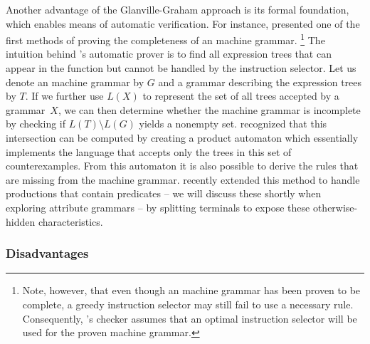 Another advantage of the \gls{Glanville-Graham approach} is its formal
foundation, which enables means of automatic verification.
%
For instance, \textcite{Emmelmann:1992:Testing} presented one of the first
methods of proving the completeness of an \gls{machine grammar}.\!%
%
\footnote{%
  Note, however, that even though an \gls{machine grammar} has been proven to be
  complete, a greedy \gls{instruction selector} may still fail to use a
  necessary \gls{rule}.
  Consequently, \citeauthor{Emmelmann:1992:Testing}'s checker assumes that an
  optimal \gls{instruction selector} will be used for the proven \gls{machine
    grammar}.%
}
%
The intuition behind \citeauthor{Emmelmann:1992:Testing}'s automatic prover is
to find all \glspl{expression tree} that can appear in the \gls{function} but
cannot be handled by the \gls{instruction selector}.
%
Let us denote an \gls{machine grammar} by $G$ and a \gls{grammar} describing the
\glspl{expression tree} by $T$\!.
%
If we further use $L(X)$ to represent the set of all \glspl{tree} accepted by a
\gls{grammar}~$X$, we can then determine whether the \gls{machine grammar} is
incomplete by checking if $L(T) \setminus L(G)$ yields a nonempty set.
%
\citeauthor{Emmelmann:1992:Testing} recognized that this intersection can be
computed by creating a \gls{product automaton} which essentially implements the
language that accepts only the \glspl{tree} in this set of counterexamples.
%
From this automaton it is also possible to derive the \glspl{rule} that are
missing from the \gls{machine grammar}.
%
\textcite{BrandnerEtAl:2010} recently extended this method to handle
\glspl{production} that contain \glspl{predicate} -- we will discuss these
shortly when exploring \glspl{attribute grammar} -- by splitting
\glspl{terminal} to expose these otherwise-hidden characteristics.


\subsubsection{Disadvantages}

